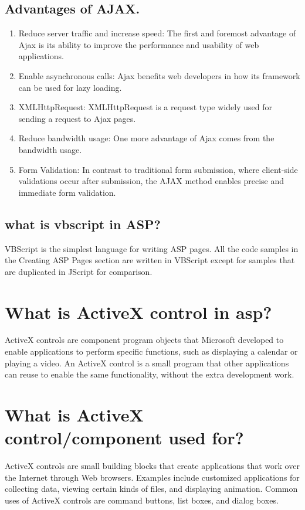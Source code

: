 \documentclass{article}
\begin{document}
\subsection{Advantages of AJAX.}
\begin{enumerate}
  \item Reduce server traffic and increase speed: The first and foremost advantage of Ajax is its ability to improve the performance and usability of web applications.
  \item Enable asynchronous calls: Ajax benefits web developers in how its framework can be used for lazy loading.
  \item XMLHttpRequest: XMLHttpRequest is a request type widely used for sending a request to Ajax pages.
  \item Reduce bandwidth usage: One more advantage of Ajax comes from the bandwidth usage.
  \item Form Validation: In contrast to traditional form submission, where client-side validations occur after submission, the AJAX method enables precise and immediate form validation.
\end{enumerate}

\subsection{what is vbscript in ASP?}
VBScript is the simplest language for writing ASP pages. All the code samples in the Creating ASP Pages section are written in VBScript except for samples that are duplicated in JScript for comparison.

\section{What is ActiveX control in asp?}
ActiveX controls are component program objects that Microsoft developed to enable applications to perform specific functions, such as displaying a calendar or playing a video. An ActiveX control is a small program that other applications can reuse to enable the same functionality, without the extra development work.

\section{What is ActiveX control/component used for?}
ActiveX controls are small building blocks that create applications that work over the Internet through Web browsers. Examples include customized applications for collecting data, viewing certain kinds of files, and displaying animation. Common uses of ActiveX controls are command buttons, list boxes, and dialog boxes.
\end{document}
